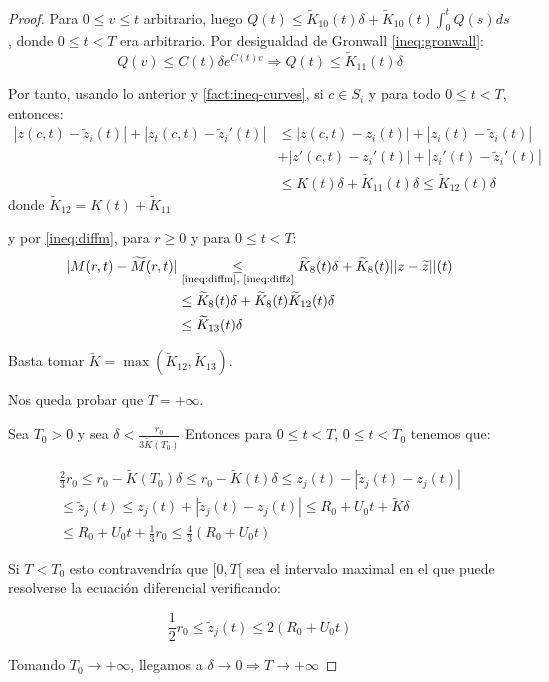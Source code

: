 \documentclass[a4paper,10pt]{scrartcl}
\theoremstyle{definition}
\newcommand{\ktilde}{\widetilde{K}}
\numberwithin{equation}{section}
\begin{document}
\begin{proof}
Para $0\le v\le t$ arbitrario, luego $Q(t) \le \ktilde_{10}(t)\delta + \ktilde_{10}(t) \int_0^{t} Q(s) ds$, donde $0\le t < T$ era arbitrario. Por desigualdad de Gronwall \eqref{ineq:gronwall}:
\[
Q(v) \le C(t) \delta e^{C(t) v} \Rightarrow Q(t) \le \ktilde_{11}(t) \delta
\]

Por tanto, usando lo anterior y \cref{fact:ineq-curves}, si $c\in S_i$ y para todo $0\le t < T$, entonces:
\begin{align}
 |z(c,t) - \widetilde{z}_i(t)| + |z_t(c,t) - \widetilde{z}_i'(t)| &\le 
 |z(c,t) - z_i(t)| + |z_i(t) - \widetilde{z}_i(t)| \nonumber\\
 &+ |z'(c,t) - z_i'(t)| + |z_i'(t) - \widetilde{z}_i'(t)| \nonumber\\
 &\le K(t)\delta +\widetilde{K}_{11}(t)\delta \le \widetilde{K}_{12}(t) \delta \label{ineq:diffz}
\end{align}
donde $\widetilde{K}_{12} = K(t) + \widetilde{K}_{11}$

y por \eqref{ineq:diffm}, para $r\ge 0$ y para $0\le t < T$:
\begin{align*}
 |M(r,t) - \widetilde{M}(r,t)| &\underset{\textrm{\eqref{ineq:diffm}, \eqref{ineq:diffz}}}{\le} \widetilde{K}_{8}(t) \delta + \ktilde_{8}(t) ||z-\widetilde{z}||(t) \\
 &\le \ktilde_8(t)\delta + \ktilde_8(t)\ktilde_{12}(t) \delta \\
 &\le \ktilde_{13}(t)\delta
\end{align*}

Basta tomar $\ktilde = \max(\ktilde_{12}, \ktilde_{13})$.

Nos queda probar que $T = + \infty$.

Sea $T_0 > 0$ y sea $\delta < \frac{r_0}{3 \ktilde(T_0)}$
Entonces para $0 \le t < T$, $0 \le t < T_0$ tenemos que:

\begin{align*}
\frac{2}{3}r_0 \le r_0 - \ktilde(T_0) \delta \le r_0 - \ktilde(t) \delta \le z_j(t) - |\widetilde{z}_j(t) - z_j(t)| \\
\le \widetilde{z}_j(t) \le z_j(t) + |\widetilde{z}_j(t) - z_j(t)|
\le R_0 + U_0t + \ktilde \delta \\
\le R_0 + U_0t + \frac{1}{3}r_0 \le \frac{4}{3}(R_0 + U_0t)
\end{align*}

Si $T < T_0$ esto contravendría que $[0,T[$ sea el intervalo maximal en el que puede resolverse la ecuación diferencial verificando:

\[
\frac{1}{2}r_0 \le \widetilde{z}_j(t) \le 2(R_0 + U_0t)
\]

Tomando $T_0 \rightarrow +\infty$, llegamos a $\delta \rightarrow 0 \Rightarrow T\rightarrow +\infty$
\end{proof}
\end{document}

